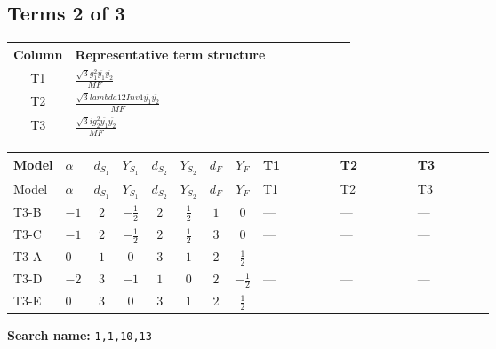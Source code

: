 \documentclass[8pt]{article}
\begin{document}
\begin{landscape}
\subsection*{Terms 2 of 3}
\begin{center}
\begin{tabular}{@{}c >{\raggedright\arraybackslash}p{0.82\linewidth}@{}}
\toprule
Column & Representative term structure \\
\midrule
T1 & \(\displaystyle \frac{\sqrt{3} g_{1}^{2} \overline{y_{1}} \overline{y_{2}}}{MF}\) \\
\midrule
T2 & \(\displaystyle \frac{\sqrt{3} lambda12Inv1 \overline{y_{1}} \overline{y_{2}}}{MF}\) \\
\midrule
T3 & \(\displaystyle \frac{\sqrt{3} i g_{2}^{2} \overline{y_{1}} \overline{y_{2}}}{MF}\) \\
\midrule
\bottomrule
\end{tabular}
\end{center}
\smallskip
\tiny
\begin{longtable}{@{}llcccccc >{\raggedright\arraybackslash}p{0.21\linewidth} >{\raggedright\arraybackslash}p{0.21\linewidth} >{\raggedright\arraybackslash}p{0.21\linewidth}@{}}
\toprule
Model & $\alpha$ & $d_{S_1}$ & $Y_{S_1}$ & $d_{S_2}$ & $Y_{S_2}$ & $d_F$ & $Y_F$ & T1 & T2 & T3 \\
\midrule
\endfirsthead
\toprule
Model & $\alpha$ & $d_{S_1}$ & $Y_{S_1}$ & $d_{S_2}$ & $Y_{S_2}$ & $d_F$ & $Y_F$ & T1 & T2 & T3 \\
\midrule
\endhead
T3-B & $-1$ & $2$ & $-\frac{1}{2}$ & $2$ & $\frac{1}{2}$ & $1$ & $0$ & --- & --- & --- \\
\midrule
T3-C & $-1$ & $2$ & $-\frac{1}{2}$ & $2$ & $\frac{1}{2}$ & $3$ & $0$ & --- & --- & --- \\
\midrule
T3-A & $0$ & $1$ & $0$ & $3$ & $1$ & $2$ & $\frac{1}{2}$ & --- & --- & --- \\
\midrule
T3-D & $-2$ & $3$ & $-1$ & $1$ & $0$ & $2$ & $-\frac{1}{2}$ & --- & --- & --- \\
\midrule
T3-E & $0$ & $3$ & $0$ & $3$ & $1$ & $2$ & $\frac{1}{2}$ & \scriptsize\adjustbox{max width=\linewidth}{$\begin{gathered} - \frac{\sqrt{3} g_{1}^{2} \overline{y_{1}} \overline{y_{2}}}{8 MF}\end{gathered}$} & \scriptsize\adjustbox{max width=\linewidth}{$\begin{gathered} \frac{\sqrt{3} lambda12Inv1 \overline{y_{1}} \overline{y_{2}}}{6 MF}\end{gathered}$} & \scriptsize\adjustbox{max width=\linewidth}{$\begin{gathered} \frac{\sqrt{3} i g_{2}^{2} \overline{y_{1}} \overline{y_{2}}}{6 MF}\end{gathered}$} \\
\midrule
\bottomrule
\end{longtable}
\clearpage
\noindent\textbf{Search name: }\texttt{1,1,10,13}\par\smallskip

\end{landscape}
\end{document}
